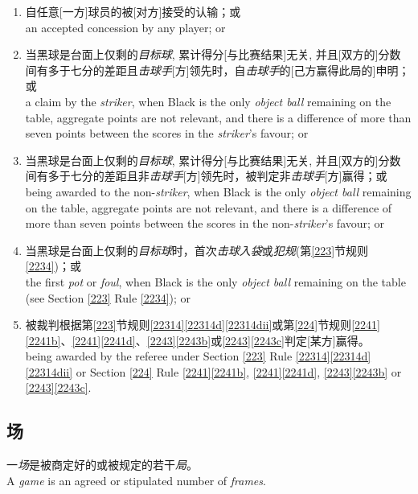 \begin{enumerate}[label=(\alph*)]
    \item 自任意[一方]球员的被[对方]接受的认输；或\\
    an accepted concession by any player; or
    \item 当黑球是台面上仅剩的\textit{目标球}, 累计得分[与比赛结果]无关, 并且[双方的]分数间有多于七分的差距且\textit{击球手}[方]领先时，自\textit{击球手}的[己方赢得此局的]申明；或\\
    a claim by the \textit{striker}, when Black is the only \textit{object ball} remaining on the table, aggregate points are not relevant, and there is a difference of more than seven points between the scores in the \textit{striker}'s favour; or
    \item 当黑球是台面上仅剩的\textit{目标球}, 累计得分[与比赛结果]无关, 并且[双方的]分数间有多于七分的差距且非\textit{击球手}[方]领先时，被判定非\textit{击球手}[方]赢得；或\\
    being awarded to the non-\textit{striker}, when Black is the only \textit{object ball} remaining on the table, aggregate points are not relevant, and there is a difference of more than seven points between the scores in the non-\textit{striker}'s favour; or
    \item 当黑球是台面上仅剩的\textit{目标球}时，首次\textit{击球入袋}或\textit{犯规}(\see{}第\ref{223}节规则\ref{2234})；或\\
    the first \textit{pot} or \textit{foul}, when Black is the only \textit{object ball} remaining on the table (see Section \ref{223} Rule \ref{2234}); or
    \item 被裁判根据第\ref{223}节规则\ref{22314}\ref{22314d}\ref{22314dii}或第\ref{224}节规则\ref{2241}\ref{2241b}、\ref{2241}\ref{2241d}、\ref{2243}\ref{2243b}或\ref{2243}\ref{2243c}判定[某方]赢得。\\
    being awarded by the referee under Section \ref{223} Rule \ref{22314}\ref{22314d} \ref{22314dii} or Section \ref{224} Rule \ref{2241}\ref{2241b}, \ref{2241}\ref{2241d}, \ref{2243}\ref{2243b} or \ref{2243}\ref{2243c}.
\end{enumerate}

\subsection{场}

\noindent 一\textit{场}是被商定好的或被规定的若干\textit{局}。\\
A \textit{game} is an agreed or stipulated number of \textit{frames}.

